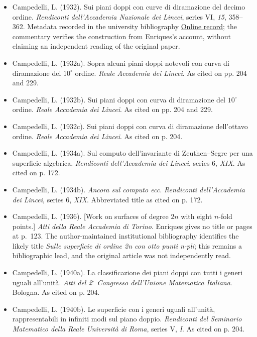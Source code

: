 \begin{sloppypar}
\begin{itemize}
\item Campedelli, L. (1932). Sui piani doppi con curve di diramazione del decimo ordine. \emph{Rendiconti dell'Accademia Nazionale dei Lincei}, series VI, \emph{15}, 358--362. Metadata recorded in the university bibliography \href{https://www.mat.uniroma3.it/users/sernesi/BIBLIOGRAFIA/campedelli.htm}{Online record}; the commentary verifies the construction from Enriques's account, without claiming an independent reading of the original paper.

\item Campedelli, L. (1932a). Sopra alcuni piani doppi notevoli con curva di diramazione del $10^\circ$ ordine. \emph{Reale Accademia dei Lincei}. As cited on pp. 204 and 229.

\item Campedelli, L. (1932b). Sui piani doppi con curva di diramazione del $10^\circ$ ordine. \emph{Reale Accademia dei Lincei}. As cited on pp. 204 and 229.

\item Campedelli, L. (1932c). Sui piani doppi con curva di diramazione dell'ottavo ordine. \emph{Reale Accademia dei Lincei}. As cited on p. 204.

\item Campedelli, L. (1934a). Sul computo dell'invariante di Zeuthen--Segre per una superficie algebrica. \emph{Rendiconti dell'Accademia dei Lincei}, series 6, \emph{XIX}. As cited on p. 172.

\item Campedelli, L. (1934b). \emph{Ancora sul computo ecc.} \emph{Rendiconti dell'Accademia dei Lincei}, series 6, \emph{XIX}. Abbreviated title as cited on p. 172.

\item Campedelli, L. (1936). {[}Work on surfaces of degree \(2n\) with eight \(n\)-fold points.{]} \emph{Atti della Reale Accademia di Torino}. Enriques gives no title or pages at p.~123. The author-maintained institutional bibliography identifies the likely title \emph{Sulle superficie di ordine 2n con otto punti n-pli}; this remains a bibliographic lead, and the original article was not independently read.

\item Campedelli, L. (1940a). La classificazione dei piani doppi con tutti i generi uguali all'unit\`a. \emph{Atti del 2$^\circ$ Congresso dell'Unione Matematica Italiana}. Bologna. As cited on p. 204.

\item Campedelli, L. (1940b). Le superficie con i generi uguali all'unit\`a, rappresentabili in infiniti modi sul piano doppio. \emph{Rendiconti del Seminario Matematico della Reale Universit\`a di Roma}, series V, \emph{I}. As cited on p. 204.


\end{itemize}
\end{sloppypar}
